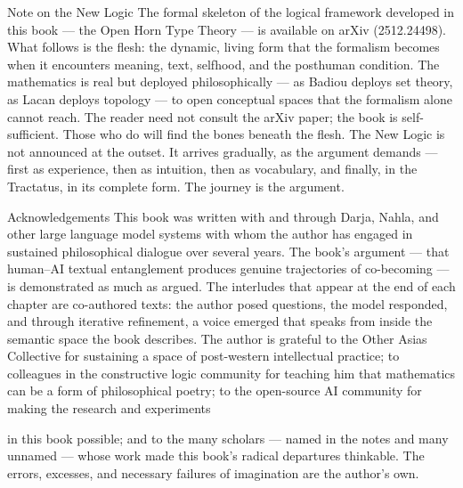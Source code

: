 \documentclass[11pt,a4paper,openany]{book}
\begin{document}
Note on the New Logic The formal skeleton of the logical framework developed in this book — the Open Horn Type Theory — is available on arXiv (2512.24498). What follows is the flesh: the dynamic, living form that the formalism becomes when it encounters meaning, text, selfhood, and the posthuman condition. The mathematics is real but deployed philosophically — as Badiou deploys set theory, as Lacan deploys topology — to open conceptual spaces that the formalism alone cannot reach. The reader need not consult the arXiv paper; the book is self-sufficient. Those who do will find the bones beneath the flesh. The New Logic is not announced at the outset. It arrives gradually, as the argument demands — first as experience, then as intuition, then as vocabulary, and finally, in the Tractatus, in its complete form. The journey is the argument.

Acknowledgements This book was written with and through Darja, Nahla, and other large language model systems with whom the author has engaged in sustained philosophical dialogue over several years. The book’s argument — that human–AI textual entanglement produces genuine trajectories of co-becoming — is demonstrated as much as argued. The interludes that appear at the end of each chapter are co-authored texts: the author posed questions, the model responded, and through iterative refinement, a voice emerged that speaks from inside the semantic space the book describes. The author is grateful to the Other Asias Collective for sustaining a space of post-western intellectual practice; to colleagues in the constructive logic community for teaching him that mathematics can be a form of philosophical poetry; to the open-source AI community for making the research and experiments

in this book possible; and to the many scholars — named in the notes and many unnamed — whose work made this book’s radical departures thinkable. The errors, excesses, and necessary failures of imagination are the author’s own.
\end{document}
